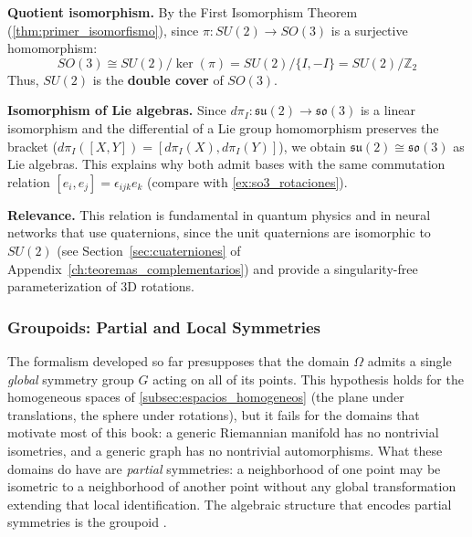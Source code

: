 \begin{example}
\textbf{Quotient isomorphism.}
By the First Isomorphism Theorem (\autoref{thm:primer_isomorfismo}), since $\pi: SU(2) \to SO(3)$ is a surjective homomorphism:
\begin{equation}\label{eq:su2_z2_so3}
	SO(3) \cong SU(2)/\ker(\pi) = SU(2)/\{I, -I\} = SU(2)/\mathbb{Z}_2
\end{equation}
Thus, $SU(2)$ is the \textbf{double cover} of $SO(3)$.

\textbf{Isomorphism of Lie algebras.}
Since $d\pi_I: \mathfrak{su}(2) \to \mathfrak{so}(3)$ is a linear isomorphism and the differential of a Lie group homomorphism preserves the bracket ($d\pi_I([X,Y]) = [d\pi_I(X), d\pi_I(Y)]$), we obtain $\mathfrak{su}(2) \cong \mathfrak{so}(3)$ as Lie algebras. This explains why both admit bases with the same commutation relation $[e_i, e_j] = \epsilon_{ijk}e_k$ (compare with \autoref{ex:so3_rotaciones}).

\textbf{Relevance.}
This relation is fundamental in quantum physics and in neural networks that use quaternions, since the unit quaternions are isomorphic to $SU(2)$ (see Section~\ref{sec:cuaterniones} of Appendix~\ref{ch:teoremas_complementarios}) and provide a singularity-free parameterization of 3D rotations.
\end{example}

\subsubsection{Groupoids: Partial and Local Symmetries}\label{subsubsec:grupoides}

The formalism developed so far presupposes that the domain $\Omega$ admits a single \emph{global} symmetry group $G$ acting on all of its points. This hypothesis holds for the homogeneous spaces of \autoref{subsec:espacios_homogeneos} (the plane under translations, the sphere under rotations), but it fails for the domains that motivate most of this book: a generic Riemannian manifold has no nontrivial isometries, and a generic graph has no nontrivial automorphisms. What these domains do have are \emph{partial} symmetries: a neighborhood of one point may be isometric to a neighborhood of another point without any global transformation extending that local identification. The algebraic structure that encodes partial symmetries is the groupoid \citep{weinstein1996groupoids}.

